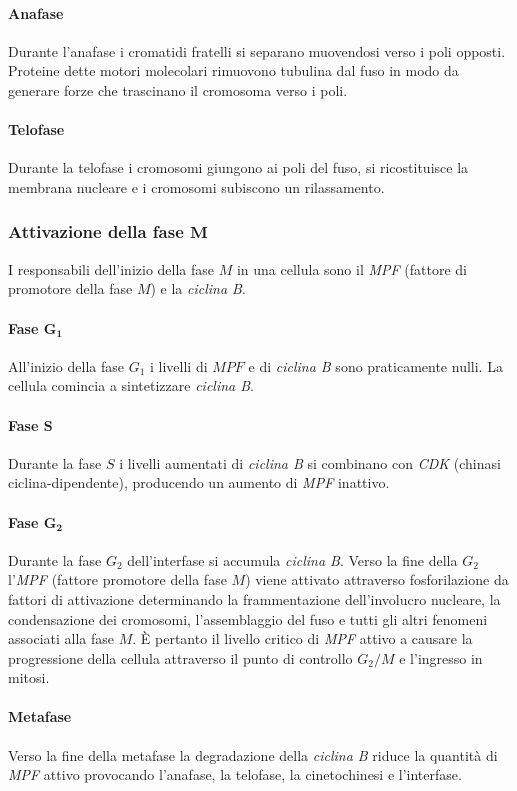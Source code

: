 \paragraph{Anafase}
Durante l'anafase i cromatidi fratelli si separano muovendosi verso i poli opposti. Proteine dette motori molecolari rimuovono tubulina dal fuso in modo da generare forze che trascinano il cromosoma 
verso i poli. 
\paragraph{Telofase}
Durante la telofase i cromosomi giungono ai poli del fuso, si ricostituisce la membrana nucleare e i cromosomi subiscono un rilassamento. 
\subsubsection{Attivazione della fase $\mathbf{M}$}
I responsabili dell'inizio della fase $M$ in una cellula sono il \emph{MPF} (fattore di promotore della fase $M$) e la \emph{ciclina B}. 
\paragraph{Fase $\mathbf{G_1}$}
All'inizio della fase $G_1$ i livelli di $MPF$ e di \emph{ciclina B} sono praticamente nulli. La cellula comincia a sintetizzare \emph{ciclina B}.
\paragraph{Fase $\mathbf{S}$}
Durante la fase $S$ i livelli aumentati di \emph{ciclina B} si combinano con \emph{CDK} (chinasi ciclina-dipendente), producendo un aumento di \emph{MPF} inattivo. 
\paragraph{Fase $\mathbf{G_2}$}
Durante la fase $G_2$ dell'interfase si accumula \emph{ciclina B}. Verso la fine della $G_2$ l'\emph{MPF} (fattore promotore della fase $M$) viene attivato attraverso fosforilazione 
da fattori di attivazione determinando la frammentazione dell'involucro nucleare, la condensazione dei cromosomi, l'assemblaggio del fuso e tutti gli altri fenomeni associati alla fase
$M$. \`E pertanto il livello critico di \emph{MPF} attivo a causare la progressione della cellula attraverso il punto di controllo $G_2/M$ e l'ingresso in mitosi. 
\paragraph{Metafase}
Verso la fine della metafase la degradazione della \emph{ciclina B} riduce la quantit\`a di \emph{MPF} attivo provocando l'anafase, la telofase, la cinetochinesi e l'interfase. 
